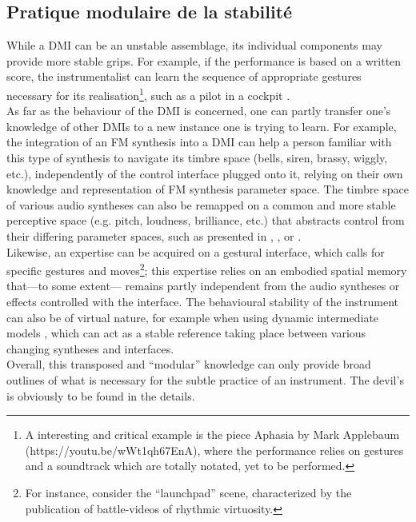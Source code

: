 \subsection{Pratique modulaire de la stabilité}

While a DMI can be an unstable assemblage, its individual components may provide more stable grips. For example, if the performance is based on a written score, the instrumentalist can learn the sequence of appropriate gestures necessary for its realisation\footnote{A interesting and critical example is the piece Aphasia by Mark Applebaum (https://youtu.be/wWt1qh67EnA), where the performance relies on gestures and a soundtrack which are totally notated, yet to be performed.}, such as a pilot in a cockpit \cite{vertegaal_towards_1996}.\\
\indent As far as the behaviour of the DMI is concerned, one can partly transfer one's knowledge of other DMIs to a new instance one is trying to learn. For example, the integration of an FM synthesis into a DMI can help a person familiar with this type of synthesis to navigate its timbre space (bells, siren, brassy, wiggly, etc.), independently of the control interface plugged onto it, relying on their own knowledge and representation of FM synthesis parameter space. The timbre space of various audio syntheses can also be remapped on a common and more stable perceptive space (e.g. pitch, loudness, brilliance, etc.) that abstracts control from their differing parameter spaces, such as presented in \cite{wessel_timbre_1979}, \cite{arfib_strategies_2002}, \cite{schwarz_sound_2012} or \cite{tubb_divergent_2014}.\\
\indent Likewise, an expertise can be acquired on a gestural interface, which calls for specific gestures and moves\footnote{For instance, consider the “launchpad” scene, characterized by the publication of battle-videos of rhythmic virtuosity.}; this expertise relies on an embodied spatial memory that—to some extent— remains partly independent from the audio syntheses or effects controlled with the interface. The behavioural stability of the instrument can also be of virtual nature, for example when using dynamic intermediate models \cite{goudard_dynamic_2011}, which can act as a stable reference taking place between various changing syntheses and interfaces.\\
\indent Overall, this transposed and “modular” knowledge can only provide broad outlines of what is necessary for the subtle practice of an instrument. The devil's is obviously to be found in the details.

